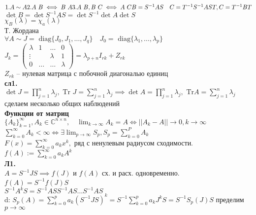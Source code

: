 \documentclass[12pt, a4paper]{article}
\begin{document}
    $
    1. A \sim A\\
    2. A ~ B \iff B ~ A\\
    3. A ~ B, B ~ C \iff A ~ C\\
    B = S^{-1}AS \quad C = T^{-1}S^{-1}AST, C = T^{-1}BT
    $\\

    $\det B = \det S^{-1}AS = \det S^{-1}\det A\det S$\\
    $\chi_B(\lambda) = \chi_a(\lambda)$\\

    Т. Жордана\\

    $\forall A \sim J = \text{ diag} \{ J_0, J_1, \dotsc, J_q\} \quad
    J_0 = \text{ diag}\{\lambda_1, \dotsc, \lambda_p \}
    $\\
    $J_k = \left(\begin{matrix}
        \lambda & 1 & \dotsc & 0 \\
        \vdots & & \lambda & 1 \\
        0 & \dotsc & \dotsc & \lambda
    \end{matrix}\right) = \lambda_{p+n} I_{rk} + Z_{rk}$\\  %
    $Z_{rk}$ -- нулевая матрица с побочной диагональю единиц\\

    \textbf{сл1.}\\
    $\det J = \prod^n_{j=1}\lambda_j, \text{ Tr } J = \sum^n_{j=1}\lambda_j \implies
    \det A = \prod_{j=1}^n \lambda_j, \text{ Tr} A = \sum^n_{j=1}\lambda_j
    $\\

    сделаем несколько общих наблюдений\\
    
    \textbf{Функции от матриц}\\
    $\{A_k\}_{k=1}^\infty, A_k \in \mathbb{C}^{n\times n}, \quad \lim_{k \to \infty} A_k = A \iff ||A_k - A|| \to 0, k \to \infty$\\
    $\sum^\infty_{k=0} A_k < \infty \iff \exists \lim_{p \to \infty}S_p, S_p = \sum^P_{k=0}A_k$\\

    $F(x) = \sum^\infty_{k=0} a_k x^k, $ ряд с ненулевым радиусом сходимости.\\
    $f(A) := \sum^\infty_{k=0}a_k A^k$\\
    \textbf{Л1.}\\
    $A = S^{-1}JS \implies f(J)$ и $f(A)$ сх. и расх. одновременно.\\
    $f(A) = S^{-1}f(J)S$\\
    $S^{-1}A^k S = S^{-1}ASS^{-1}AS \dotsc S^{-1}AS$\\
    d:
    $S_p (A) = \sum^p_{k=0} a_k (S^{-1}JS)^k = S^{-1} \sum^p_{k=0} a_k J^kS = 
    S^{-1}S_p(J)S 
    $ пределим $p \to \infty$\\
\end{document}
